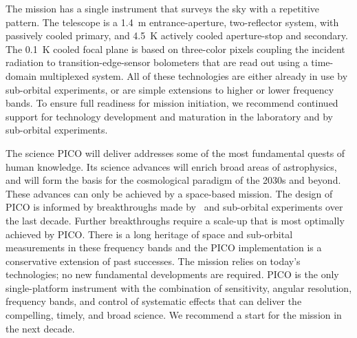 \documentclass[PICOReport.tex]{subfiles}
\begin{document}

The mission has a single instrument that surveys the sky with a repetitive pattern.  The telescope is a 1.4~m entrance-aperture, two-reflector system, with passively cooled primary, and 4.5~K actively cooled aperture-stop and secondary. The 0.1~K cooled focal plane is based on three-color pixels coupling the incident radiation to transition-edge-sensor bolometers that are read out using a time-domain multiplexed system. All of these technologies are either already in use by sub-orbital experiments, or are simple extensions to higher or lower frequency bands. To ensure full readiness for mission initiation, we recommend continued support for technology development and maturation in the laboratory and by sub-orbital experiments. 

The science PICO will deliver addresses some of the most fundamental quests of human knowledge. Its science advances will enrich broad areas of astrophysics, and will form the basis for the cosmological paradigm of the 2030s and beyond.  These advances can only be achieved by a space-based mission. The design of PICO is informed by breakthroughs made by \planck\ and sub-orbital experiments over the last decade. Further breakthroughs require a scale-up that is most optimally achieved by PICO.  There is a long heritage of space and sub-orbital measurements in these frequency bands and the PICO implementation is a conservative extension of past successes. The mission relies on today's technologies; no new fundamental developments are required. PICO is the only single-platform instrument with the combination of sensitivity, angular resolution, frequency bands, and control of systematic effects that can deliver the compelling, timely, and broad science. We recommend a start for the mission in the next decade. 

\end{document}
